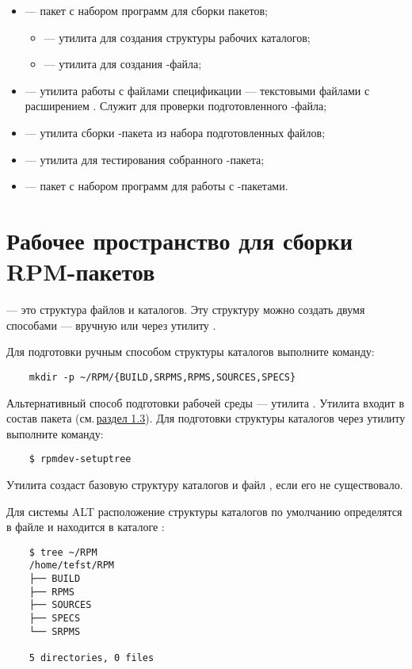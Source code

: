 \begin{itemize}
	\item {} --- пакет с набором программ для сборки пакетов; 
	\begin{itemize}
		\item {} --- утилита для создания структуры рабочих каталогов;
		\item {} --- утилита для создания -файла;
	\end{itemize}
	\item {} --- утилита работы с файлами спецификации --- текстовыми файлами с расширением 
		. Служит для проверки подготовленного -файла;
	\item {} --- утилита сборки -пакета из набора подготовленных файлов;
	\item {} --- утилита для тестирования собранного -пакета;
	\item {} --- пакет с набором программ для работы с -пакетами.
\end{itemize}


\section{Рабочее пространство для сборки RPM-пакетов}
 --- это структура файлов и каталогов. Эту структуру 
можно создать двумя способами --- вручную или через утилиту .

Для подготовки ручным способом структуры каталогов выполните команду:
\begin{verbatim}
	mkdir -p ~/RPM/{BUILD,SRPMS,RPMS,SOURCES,SPECS}
\end{verbatim}

Альтернативный способ подготовки рабочей среды --- утилита . Утилита входит в 
состав пакета  (см.\,\hyperlink{1.3}{раздел 1.3}). Для подготовки структуры каталогов 
через утилиту  выполните команду:
\begin{verbatim}
	$ rpmdev-setuptree
\end{verbatim}

Утилита создаст базовую структуру каталогов и файл , если его не существовало.

Для системы ALT расположение структуры каталогов%
по умолчанию определятся в файле  и находится в каталоге :
\begin{verbatim}
	$ tree ~/RPM
	/home/tefst/RPM
	├── BUILD
	├── RPMS
	├── SOURCES
	├── SPECS
	└── SRPMS
	
	5 directories, 0 files
\end{verbatim}

